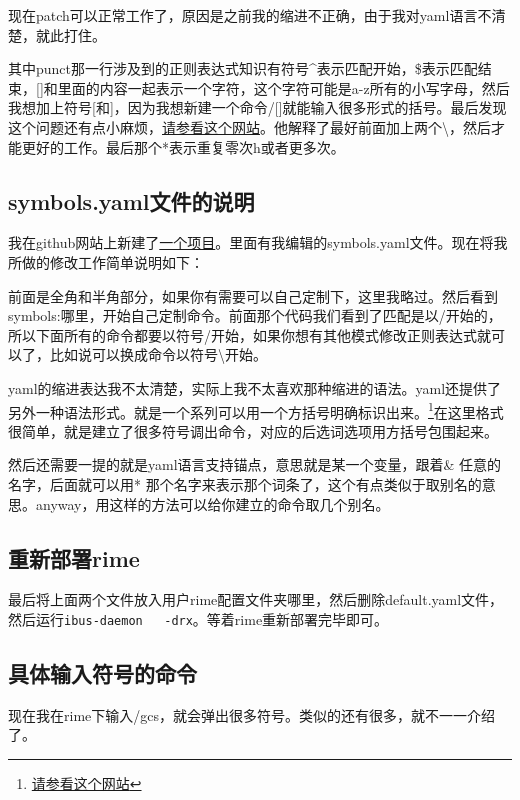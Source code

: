 现在patch可以正常工作了，原因是之前我的缩进不正确，由于我对yaml语言不清楚，就此打住。

其中punct那一行涉及到的正则表达式知识有符号\^{}表示匹配开始，\$表示匹配结束，[]和里面的内容一起表示一个字符，这个字符可能是a-z所有的小写字母，然后我想加上符号[和]，因为我想新建一个命令/[]就能输入很多形式的括号。最后发现这个问题还有点小麻烦，\href{http://www.infoq.com/cn/news/2011/01/regular-expressions-1}{请参看这个网站}。他解释了最好前面加上两个\textbackslash ，然后才能更好的工作。最后那个*表示重复零次h或者更多次。

\subsection{symbols.yaml文件的说明}
我在github网站上新建了\href{https://github.com/a358003542/rime-symbols-yaml}{一个项目}。里面有我编辑的symbols.yaml文件。现在将我所做的修改工作简单说明如下：

前面是全角和半角部分，如果你有需要可以自己定制下，这里我略过。然后看到symbols:哪里，开始自己定制命令。前面那个代码我们看到了匹配是以/开始的，所以下面所有的命令都要以符号/开始，如果你想有其他模式修改正则表达式就可以了，比如说可以换成命令以符号\textbackslash 开始。

yaml的缩进表达我不太清楚，实际上我不太喜欢那种缩进的语法。yaml还提供了另外一种语法形式。就是一个系列可以用一个方括号明确标识出来。\footnote{\href{http://www.dev.idv.tw/mediawiki/index.php/YAML}{请参看这个网站}}在这里格式很简单，就是建立了很多符号调出命令，对应的后选词选项用方括号包围起来。

然后还需要一提的就是yaml语言支持锚点，意思就是某一个变量，跟着\& 任意的名字，后面就可以用* 那个名字来表示那个词条了，这个有点类似于取别名的意思。anyway，用这样的方法可以给你建立的命令取几个别名。

\subsection{重新部署rime}
最后将上面两个文件放入用户rime配置文件夹哪里，然后删除default.yaml文件，然后运行\verb+ibus-daemon   -drx+。等着rime重新部署完毕即可。

\subsection{具体输入符号的命令}
现在我在rime下输入/gcs，就会弹出很多符号。类似的还有很多，就不一一介绍了。

